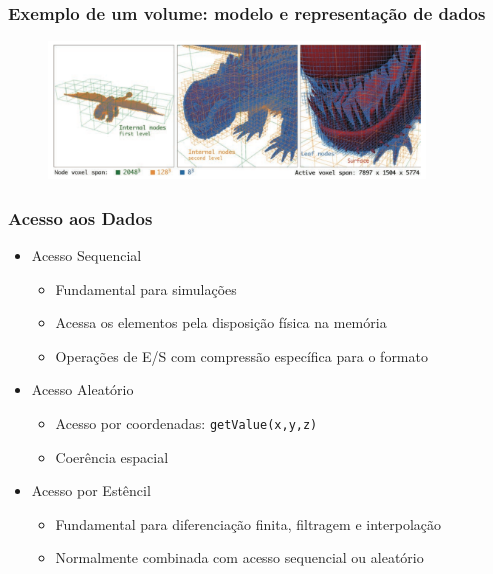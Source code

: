 \documentclass{beamer}
\begin{document}
\begin{frame}

\frametitle{Exemplo de um volume: modelo e representação de dados}

\begin{figure}[!htb]
\center
\includegraphics[width=10cm]{dragon}  
\end{figure}

\end{frame}

\begin{frame}

\frametitle{Acesso aos Dados}

\begin{itemize}
\item Acesso Sequencial
\begin{itemize}
\item Fundamental para simulações
\item Acessa os elementos pela disposição física na memória
\item Operações de E/S com compressão específica para o formato
\end{itemize}
\item Acesso Aleatório
\begin{itemize}
\item Acesso por coordenadas: \texttt{getValue(x,y,z)}
\item Coerência espacial
\end{itemize}
\item Acesso por Estêncil
\begin{itemize}
\item Fundamental para diferenciação finita, filtragem e interpolação
\item Normalmente combinada com acesso sequencial ou aleatório
\end{itemize}
\end{itemize}

\end{frame}
\end{document}
